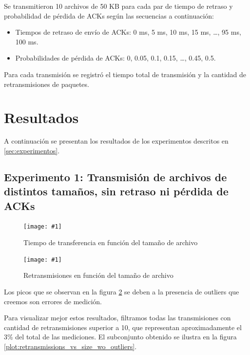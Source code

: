 \documentclass[a4paper, 10pt, twoside]{article}
\newcommand{\grafico}[3]{
  \begin{figure}[H]
    \texttt{[image: \#1]}
    \caption{#2}
    \label{#3}
  \end{figure}
}
\begin{document}
Se transmitieron 10 archivos de 50 KB para cada par de tiempo de retraso y probabilidad de pérdida de ACKs según las secuencias a continuación:

\begin{itemize}
  \item Tiempos de retraso de envío de ACKs:  0 ms, 5 ms, 10 ms, 15 ms, \ldots, 95 ms, 100 ms.
  \item Probabilidades de pérdida de ACKs: 0, 0.05, 0.1, 0.15, \ldots, 0.45, 0.5.
\end{itemize}

Para cada transmisión se registró el tiempo total de transmisión y la cantidad de retransmisiones de paquetes.




\section{Resultados}
\label{sec:resultados}

A continuación se presentan los resultados de los experimentos descritos en \ref{sec:experimentos}.


\subsection{Experimento 1: Transmisión de archivos de distintos tamaños, sin retraso ni pérdida de ACKs}
\label{sec:experimento-distintos-tamanos-de-archivo}

\grafico{time_vs_size}
        {Tiempo de transferencia en función del tamaño de archivo}
        {plot:time_vs_size}

\grafico{retransmissions_vs_size}
        {Retransmisiones en función del tamaño de archivo}
        {plot:retransmissions_vs_size}

Los picos que se observan en la figura \ref{plot:retransmissions_vs_size} se deben a la presencia de outliers que creemos son errores de medición.

Para visualizar mejor estos resultados, filtramos todas las transmisiones con cantidad de retransmisiones superior a 10, que representan aproximadamente el 3\% del total de las mediciones. El subconjunto obtenido se ilustra en la figura \ref{plot:retransmissions_vs_size_wo_outliers}.
\end{document}
